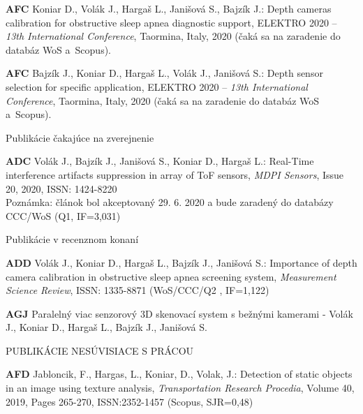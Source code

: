 \noindent \textbf{AFC} Koniar D., Volák J., Hargaš L., Janišová S., Bajzík J.: Depth cameras calibration for obstructive sleep apnea diagnostic support, ELEKTRO 2020 – \textit{13th International Conference}, Taormina, Italy, 2020 (čaká sa na zaradenie do databáz WoS a Scopus). \newline

\noindent \textbf{AFC} Bajzík J., Koniar D., Hargaš L., Volák J., Janišová S.: Depth sensor selection for specific application, ELEKTRO 2020 – \textit{13th International Conference}, Taormina, Italy, 2020  (čaká sa na zaradenie do databáz WoS a Scopus). \newline

\begin{center}
	\Large Publikácie čakajúce na zverejnenie 
\end{center}

\noindent \textbf{ADC} Volák J., Bajzík J., Janišová S., Koniar D., Hargaš L.: Real-Time interference artifacts suppression in array of ToF sensors, \textit{MDPI Sensors}, Issue 20, 2020, ISSN: 1424-8220  \\
\noindent Poznámka: článok bol akceptovaný 29. 6. 2020 a bude zaradený do databázy CCC/WoS (Q1, IF=3,031) \newline

\begin{center}
	\Large Publikácie v recenznom konaní
\end{center}

\noindent \textbf{ADD} Volák J., Koniar D., Hargaš L., Bajzík J., Janišová S.: Importance of depth camera calibration in obstructive sleep apnea screening system, \textit{Measurement Science Review}, ISSN: 1335-8871 (WoS/CCC/Q2 , IF=1,122) \newline

\noindent \textbf{AGJ} Paralelný viac senzorový 3D skenovací system s bežnými kamerami - Volák J., Koniar D., Hargaš L., Bajzík J., Janišová S. \newline

\newpage
\begin{center}
	\LARGE PUBLIKÁCIE NESÚVISIACE S PRÁCOU
\end{center}

\noindent \textbf{AFD} Jabloncik, F., Hargas, L., Koniar, D., Volak, J.: Detection of static objects in an image using texture analysis, \textit{Transportation Research Procedia}, Volume 40, 2019, Pages 265-270, ISSN:2352-1457 (Scopus,  SJR=0,48) \newline


